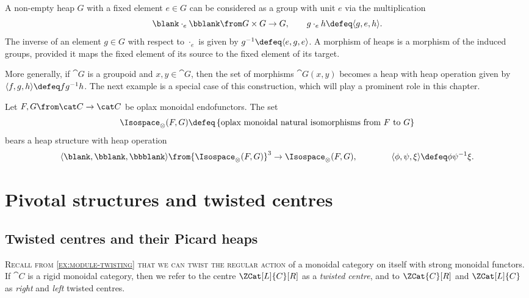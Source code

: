 \begin{lemma}\label{lem: heaps_to_groups}
  A non-empty heap \(G\) with a fixed element \(e \in G\) can be considered as a group with unit \(e\) via the multiplication
  \[
    \blank \cdot_e \bblank \from G \times G \to G, \qquad g \cdot_e h \defeq \langle g, e, h \rangle.
  \]
  The inverse of an element \(g \in G\) with respect to \(\cdot_e\) is given by \(g^{-1} \defeq \langle e, g, e \rangle\).
  A morphism of heaps is a morphism of the induced groups, provided it maps the fixed element of its source to the fixed element of its target.
\end{lemma}

More generally, if \(\cat{G}\) is a groupoid and \(x, y \in \cat{G}\),
then the set of morphisms \(\cat{G}(x, y)\) becomes a heap with heap operation given by
\(\langle f, g, h \rangle \defeq f g^{-1} h\).
The next example is a special case of this construction,
which will play a prominent role in this chapter.

\begin{example}\label{ex: heap_of_nat_isos}
  Let \(F, G \from \cat C \to \cat C\) be oplax monoidal endofunctors. The set
  \[
    \Isospace_\otimes (F, G) \defeq \left\{\text{oplax monoidal natural isomorphisms from \(F\) to \(G\)} \right\}
  \]
  bears a heap structure with heap operation
  \[
    \langle \blank , \bblank , \bbblank \rangle \from {\Isospace_\otimes(F, G)}^3 \to \Isospace_\otimes (F, G),
    \qquad \qquad
    \langle \phi, \psi, \xi \rangle \defeq \phi \psi^{-1} \xi.
  \]
\end{example}

\section{Pivotal structures and twisted centres}\label{sec: pivotality_of_the_df_centre}

\subsection{Twisted centres and their Picard heaps}\label{subsec: twisted_centres}

\textsc{Recall from \cref{ex:module-twisting} that we can twist the regular action}
of a monoidal category on itself with strong monoidal functors.
If \(\cat{C}\) is a rigid monoidal category,
then we refer to the centre \(\ZCat[L]{C}[R]\) as a \emph{twisted centre},
and to \(\ZCat{C}[R]\) and \(\ZCat[L]{C}\) as \emph{right} and \emph{left} twisted centres.

